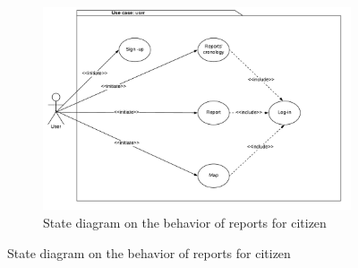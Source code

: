 \documentclass[12pt,a4paper]{report}
\begin{document}
				\begin{figure}[H]
					\begin{subfigure}{\textwidth}
						\includegraphics[scale = 0.75, center]{UseCaseC}
						\caption{State diagram on the behavior of reports for citizen}
					\end{subfigure}
				\end{figure}
\end{document}
